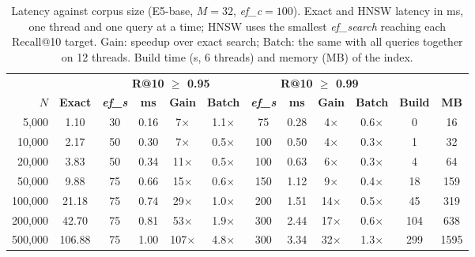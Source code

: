\begin{table}[tbp]
\caption{Latency against corpus size (E5-base, $M=32$, \textit{ef\_c}$=100$). Exact and HNSW latency in ms, one thread and one query at a time; HNSW uses the smallest \textit{ef\_search} reaching each Recall@10 target. Gain: speedup over exact search; Batch: the same with all queries together on 12 threads. Build time (s, 6 threads) and memory (MB) of the index.}\label{tab:escalabilidad_e5_base}
\centering
\small
\begin{tabular}{|r|c|c|c|c|c|c|c|c|c|c|c|}
\hline
 & & \multicolumn{4}{c|}{\textbf{R@10 $\geq$ 0.95}} & \multicolumn{4}{c|}{\textbf{R@10 $\geq$ 0.99}} & & \\ \cline{3-10}
\textbf{$N$} & \textbf{Exact} & \textbf{\textit{ef\_s}} & \textbf{ms} & \textbf{Gain} & \textbf{Batch} & \textbf{\textit{ef\_s}} & \textbf{ms} & \textbf{Gain} & \textbf{Batch} & \textbf{Build} & \textbf{MB} \\
\hline
5,000 & 1.10 & 30 & 0.16 & 7$\times$ & 1.1$\times$ & 75 & 0.28 & 4$\times$ & 0.6$\times$ & 0 & 16 \\
10,000 & 2.17 & 50 & 0.30 & 7$\times$ & 0.5$\times$ & 100 & 0.50 & 4$\times$ & 0.3$\times$ & 1 & 32 \\
20,000 & 3.83 & 50 & 0.34 & 11$\times$ & 0.5$\times$ & 100 & 0.63 & 6$\times$ & 0.3$\times$ & 4 & 64 \\
50,000 & 9.88 & 75 & 0.66 & 15$\times$ & 0.6$\times$ & 150 & 1.12 & 9$\times$ & 0.4$\times$ & 18 & 159 \\
100,000 & 21.18 & 75 & 0.74 & 29$\times$ & 1.0$\times$ & 200 & 1.51 & 14$\times$ & 0.5$\times$ & 45 & 319 \\
200,000 & 42.70 & 75 & 0.81 & 53$\times$ & 1.9$\times$ & 300 & 2.44 & 17$\times$ & 0.6$\times$ & 104 & 638 \\
500,000 & 106.88 & 75 & 1.00 & 107$\times$ & 4.8$\times$ & 300 & 3.34 & 32$\times$ & 1.3$\times$ & 299 & 1595 \\
\hline
\end{tabular}
\end{table}